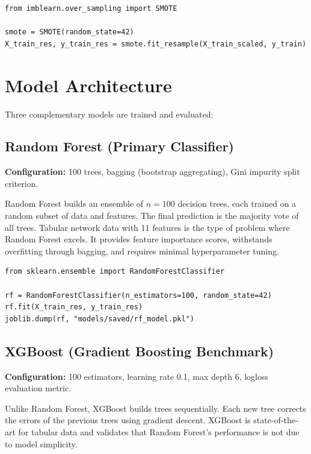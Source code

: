 \documentclass[12pt,a4paper]{report}
\begin{document}
\begin{lstlisting}[caption={SMOTE on training set only}]
from imblearn.over_sampling import SMOTE

smote = SMOTE(random_state=42)
X_train_res, y_train_res = smote.fit_resample(X_train_scaled, y_train)
\end{lstlisting}

\section{Model Architecture}\label{sec:models}

Three complementary models are trained and evaluated:

\subsection{Random Forest (Primary Classifier)}

\textbf{Configuration:} 100 trees, bagging (bootstrap aggregating), Gini impurity split criterion.

Random Forest builds an ensemble of $n=100$ decision trees, each trained on a random subset of data and features. The final prediction is the majority vote of all trees. Tabular network data with 11 features is the type of problem where Random Forest excels. It provides feature importance scores, withstands overfitting through bagging, and requires minimal hyperparameter tuning.

\begin{lstlisting}[caption={Random Forest training}]
from sklearn.ensemble import RandomForestClassifier

rf = RandomForestClassifier(n_estimators=100, random_state=42)
rf.fit(X_train_res, y_train_res)
joblib.dump(rf, "models/saved/rf_model.pkl")
\end{lstlisting}

\subsection{XGBoost (Gradient Boosting Benchmark)}

\textbf{Configuration:} 100 estimators, learning rate 0.1, max depth 6, logloss evaluation metric.

Unlike Random Forest, XGBoost builds trees sequentially. Each new tree corrects the errors of the previous trees using gradient descent. XGBoost is state-of-the-art for tabular data and validates that Random Forest's performance is not due to model simplicity.
\end{document}
